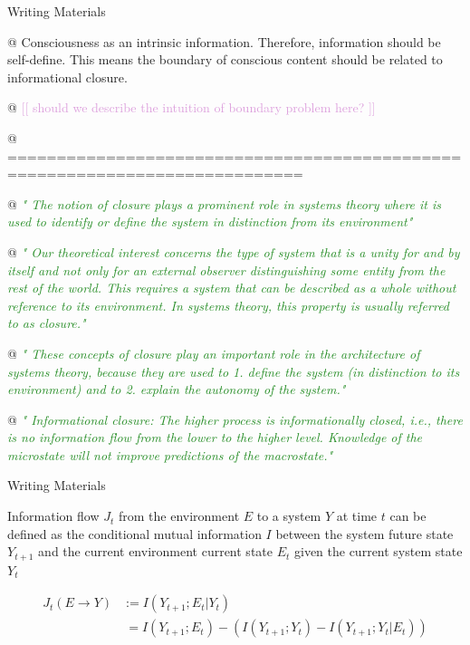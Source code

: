 \documentclass[utf8]{article}
\newenvironment{writingMaterials}
			{	
			\begin{tcolorbox}[size=small, colframe=black!20!white, toprule=1mm]
				Writing Materials
			\end{tcolorbox}
			
			\begin{easylist}[itemize]		
			}
			{
			\end{easylist}
			\begin{tcolorbox}[size=small, bottomrule=1mm, halign=flush right, colframe=black!20!white]
				Writing Materials
			\end{tcolorbox}			
			}
\newcommand{\rewrite}[1]{\textcolor{ForestGreen}{\textit{"#1"}}\newline}
\newcommand{\idea}[2][Plum]{\noindent
				\textcolor{#1}{[[ #2 ]]}}
\begin{document}
		\begin{writingMaterials}			
			@ Consciousness as an intrinsic information. Therefore, information should be self-define. This means the boundary of conscious content should be related to informational closure. 
			
			@ \idea{should we describe the intuition of boundary problem here?}
			
			@ ============================================================================
			
			
			@ \rewrite{
				The notion of closure plays a prominent role in systems theory where it is used to identify or define the system in distinction from its environment} \cite{BERTSCHINGER.2006}
	
			@ \rewrite{
				Our theoretical interest concerns the type of system that is a unity for and by itself and not only for an external observer distinguishing some entity from the rest of the world. This requires a system that can be described as a whole without reference to its environment. In systems theory, this property is usually referred to as closure.}\citep{BERTSCHINGER.2006}
			
			@ \rewrite{
				These concepts of closure play an important role in the architecture of systems
				theory, because they are used to
				1. define the system (in distinction to its environment) and to 
				2. explain the autonomy of the system.}\citep{BERTSCHINGER.2006}
			
			@ \rewrite{
				Informational closure: The higher process is informationally closed, i.e., there is no information flow from the lower to the higher level. Knowledge of the microstate will not improve predictions of the macrostate.} \citep[p. 4]{PFANTE.2014}
			
							
		\end{writingMaterials}
	
	
			\noindent
			Information flow $J_{t}$ from the environment $E$ to a system $Y$ at time $t$ can be defined as the conditional mutual information $I$ between the system future state $Y_{t+1}$ and the current environment current state $E_{t}$ given the current system state $Y_{t}$
				
				\begin{equation}\label{eq:InformationFlow}
				\left.\begin{array}
				{rl}{J_{t}(E \rightarrow Y )} & {:= I(Y_{t+1};E_{t}|Y_{t})} \\
				{ } & { \ = I(Y_{t+1};E_{t}) - (I(Y_{t+1};Y_{t})-I(Y_{t+1};Y_{t}|E_{t}))}
				\end{array}\right.
				\end{equation}
		
\end{document}
